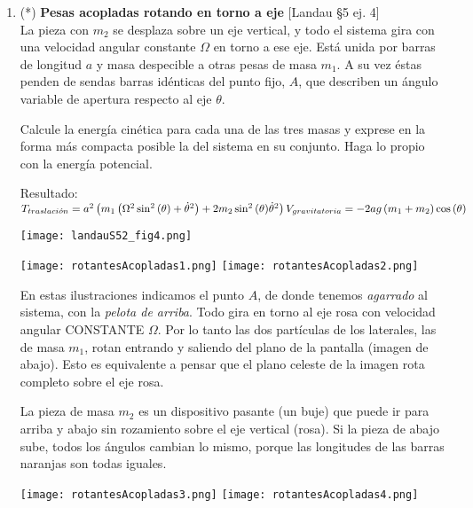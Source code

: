 \documentclass[11pt, spanish, a4paper, twoside]{article}
\begin{document}
\begin{enumerate}
\item
	\begin{minipage}[t][7cm]{0.65\textwidth}
		(*) \textbf{Pesas acopladas rotando en torno a eje} [Landau \S5 ej. 4]\\

		La pieza con \(m_2\) se desplaza sobre un eje vertical, y todo el sistema gira con una velocidad angular constante \(\Omega\) en torno a ese eje.
		Está unida por barras de longitud \(a\) y masa despecible a otras pesas de masa \(m_1\).
		A su vez éstas penden de sendas barras idénticas del punto fijo, \(A\), que describen un ángulo variable de apertura respecto al eje \(\theta\).

		Calcule la energía cinética para cada una de las tres masas y exprese en la forma más compacta posible la del sistema en su conjunto.
		Haga lo propio con la energía potencial.

		Resultado:\\
		\(
			T_{traslaci\acute{o}n} = a^{2} \left( m_{1} \left( \Omega^{2} \sin^{2}{\left(\theta \right)} + \dot{\theta}^{2}\right) + 2 m_{2} \sin^{2}{\left(\theta \right)} \dot{\theta}^{2} \right) \\
			V_{gravitatoria} = - 2 a g \left(m_{1} + m_{2}\right) \cos{\left(\theta \right)}
		\)
	\end{minipage}
	\begin{minipage}[c][1cm][t]{0.35\textwidth}
		\texttt{[image: landauS52\_fig4.png]}
	\end{minipage}

	\begin{center}
		\texttt{[image: rotantesAcopladas1.png]}
		\texttt{[image: rotantesAcopladas2.png]}
	\end{center}

	En estas ilustraciones indicamos el punto \(A\), de donde tenemos \emph{agarrado} al sistema, con la \emph{pelota de arriba}.
	Todo gira en torno al eje rosa con velocidad angular CONSTANTE $\Omega$.
	Por lo tanto las dos partículas de los laterales, las de masa $m_1$, rotan entrando y saliendo del plano de la pantalla (imagen de abajo).
	Esto es equivalente a pensar que el plano celeste de la imagen rota completo sobre el eje rosa.
	
	La pieza de masa $m_2$ es un dispositivo pasante (un buje) que puede ir para arriba y abajo sin rozamiento sobre el eje vertical (rosa).
	Si la pieza de abajo sube, todos los ángulos cambian lo mismo, porque las longitudes de las barras naranjas son todas iguales.
	
	\begin{center}
		\texttt{[image: rotantesAcopladas3.png]}
		\texttt{[image: rotantesAcopladas4.png]}
	\end{center}
	

\end{enumerate}
\end{document}
